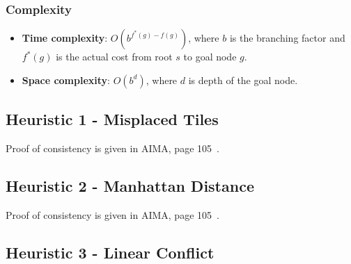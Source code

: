 \documentclass{llncs}
\begin{document}
\subsubsection{Complexity}
\begin{itemize}
	\item[] \textbf{Time complexity}: $O(b^{f^*(g)-f(g)})$, where $b$ is the branching factor and $f^*(g)$ is the actual cost from root $s$ to goal node $g$.
	\item[] \textbf{Space complexity}: $O(b^d)$, where $d$ is depth of the goal node.
\end{itemize}

\subsection{Heuristic 1 - Misplaced Tiles}

Proof of consistency is given in AIMA, page 105~\cite{aima}.

\subsection{Heuristic 2 - Manhattan Distance}

Proof of consistency is given in AIMA, page 105~\cite{aima}.

\subsection{Heuristic 3 - Linear Conflict}
\end{document}
